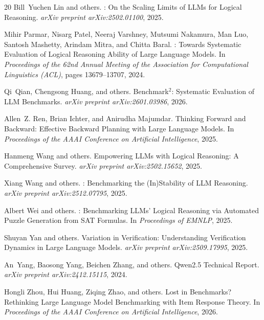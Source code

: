 \documentclass{article}
\begin{document}
\begin{thebibliography}{20}
Bill~Yuchen Lin and others.
: On the Scaling Limits of {LLMs} for Logical Reasoning.
\newblock \emph{arXiv preprint arXiv:2502.01100}, 2025.

Mihir Parmar, Nisarg Patel, Neeraj Varshney, Mutsumi Nakamura, Man Luo, Santosh Mashetty, Arindam Mitra, and Chitta Baral.
: Towards Systematic Evaluation of Logical Reasoning Ability of Large Language Models.
\newblock In \emph{Proceedings of the 62nd Annual Meeting of the Association for Computational Linguistics (ACL)}, pages 13679--13707, 2024.

Qi~Qian, Chengsong Huang, and others.
\newblock Benchmark$^2$: Systematic Evaluation of {LLM} Benchmarks.
\newblock \emph{arXiv preprint arXiv:2601.03986}, 2026.

Allen~Z. Ren, Brian Ichter, and Anirudha Majumdar.
\newblock Thinking Forward and Backward: Effective Backward Planning with Large Language Models.
\newblock In \emph{Proceedings of the AAAI Conference on Artificial Intelligence}, 2025.

Hanmeng Wang and others.
\newblock Empowering {LLMs} with Logical Reasoning: A Comprehensive Survey.
\newblock \emph{arXiv preprint arXiv:2502.15652}, 2025{}.

Xiang Wang and others.
: Benchmarking the (In)Stability of {LLM} Reasoning.
\newblock \emph{arXiv preprint arXiv:2512.07795}, 2025{}.

Albert Wei and others.
: Benchmarking {LLMs'} Logical Reasoning via Automated Puzzle Generation from {SAT} Formulas.
\newblock In \emph{Proceedings of EMNLP}, 2025.

Shuyan Yan and others.
\newblock Variation in Verification: Understanding Verification Dynamics in Large Language Models.
\newblock \emph{arXiv preprint arXiv:2509.17995}, 2025.

An~Yang, Baosong Yang, Beichen Zhang, and others.
\newblock Qwen2.5 Technical Report.
\newblock \emph{arXiv preprint arXiv:2412.15115}, 2024.

Hongli Zhou, Hui Huang, Ziqing Zhao, and others.
\newblock Lost in Benchmarks? Rethinking Large Language Model Benchmarking with Item Response Theory.
\newblock In \emph{Proceedings of the AAAI Conference on Artificial Intelligence}, 2026.

\end{thebibliography}
\end{document}
